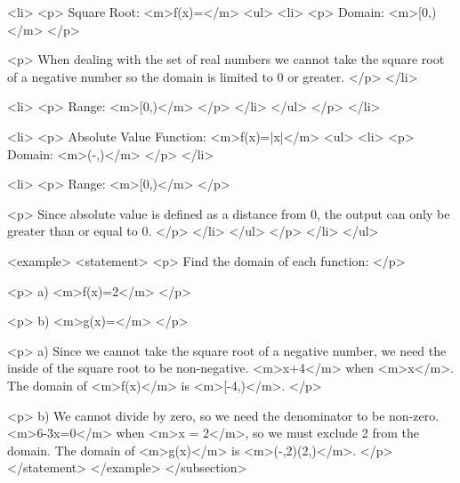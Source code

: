             <li>
                <p>
                    Square Root: <m>f(x)=</m>
                    <ul>
                        <li>
                            <p>
                                Domain: <m>[0,\infty)</m>
                            </p>

                            <p>
                                When dealing with the set of real numbers we cannot take the square root of a negative number so the domain is limited to 0 or greater.
                            </p>
                        </li>

                        <li>
                            <p>
                                Range: <m>[0,\infty)</m>
                            </p>
                        </li>
                    </ul>
                </p>
            </li>

            <li>
                <p>
                    Absolute Value Function: <m>f(x)=|x|</m>
                    <ul>
                        <li>
                            <p>
                                Domain: <m>(-\infty,\infty)</m>
                            </p>
                        </li>

                        <li>
                            <p>
                                Range: <m>[0,\infty)</m>
                            </p>

                            <p>
                                Since absolute value is defined as a distance from 0, the output can only be greater than or equal to 0.
                            </p>
                        </li>
                    </ul>
                </p>
            </li>
        </ul>

        <example>
            <statement>
                <p>
                    Find the domain of each function:
                </p>

                <p>
                    a) <m>f(x)=2</m>
                </p>

                <p>
                    b) <m>g(x)=</m>
                </p>

                <p>
                    a) Since we cannot take the square root of a negative number, we need the inside of the square root to be non-negative.
                    <m>x+4</m> when <m>x</m>.
                    The domain of <m>f(x)</m> is <m>[-4,\infty)</m>.
                </p>

                <p>
                    b) We cannot divide by zero, so we need the denominator to be non-zero.
                    <m>6-3x=0</m> when <m>x = 2</m>, so we must exclude 2 from the domain.
                    The domain of <m>g(x)</m> is <m>(-\infty,2)\cup(2,\infty)</m>.
                </p>
            </statement>
        </example>
    </subsection>


